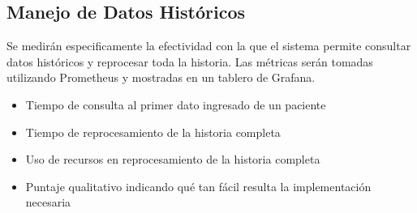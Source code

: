 \subsection{Manejo de Datos Históricos}

Se medirán especificamente la efectividad con la que el sistema permite consultar datos históricos y reprocesar toda la historia.
Las métricas serán tomadas utilizando Prometheus y mostradas en un tablero de Grafana.

\begin{itemize}
    \item Tiempo de consulta al primer dato ingresado de un paciente
    \item Tiempo de reprocesamiento de la historia completa
    \item Uso de recursos en reprocesamiento de la historia completa
    \item Puntaje qualitativo indicando qué tan fácil resulta la implementación necesaria
\end{itemize}
